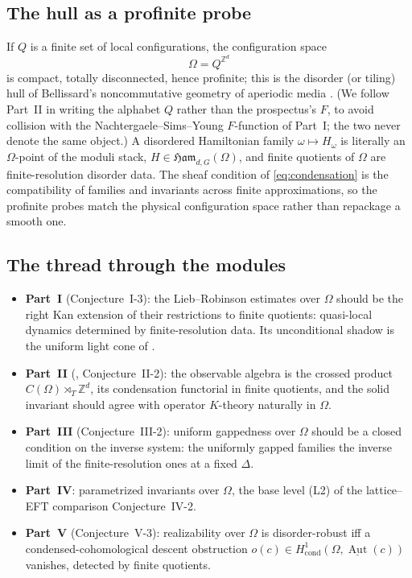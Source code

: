 \documentclass[12pt]{article}
\newcommand{\cg}[1]{\underline{#1}}            %
\newcommand{\Ffun}{F}                          %
\newcommand{\Ham}{\mathfrak{Ham}}              %
\newcommand{\gapbound}{\Delta}                  %
\newcommand{\dis}{\Omega}                       %
\newcommand{\ZZ}{\mathbb{Z}}
\newcommand{\Aut}{\operatorname{Aut}}
\theoremstyle{plain}
\theoremstyle{definition}
\theoremstyle{remark}
\begin{document}
\subsection{The hull as a profinite probe}

If $Q$ is a finite set of local configurations, the configuration space
\begin{equation}
\label{eq:hull}
\dis=Q^{\ZZ^d}
\end{equation}
is compact, totally disconnected, hence profinite; this is the disorder (or tiling) hull of
Bellissard's noncommutative geometry of aperiodic media \cite{bellissard-ncg-qhe,kellendonk-tilings}.
(We follow Part~II in writing the
alphabet $Q$ rather than the prospectus's $\Ffun$, to avoid collision with the
Nachtergaele--Sims--Young $\Ffun$-function of Part~I; the two never denote the same
object.) A disordered Hamiltonian family $\omega\mapsto H_\omega$ is literally an
$\dis$-point of the moduli stack, $H\in\Ham_{d,G}(\dis)$, and finite quotients of $\dis$
are finite-resolution disorder data. The sheaf condition of \eqref{eq:condensation} is
the compatibility of families and invariants across finite approximations, so the
profinite probes match the physical configuration space rather than repackage a smooth
one.

\subsection{The thread through the modules}

\begin{itemize}
\item \textbf{Part~I} (Conjecture~I-3): the Lieb--Robinson estimates over $\dis$ should be
  the right Kan extension of their restrictions to finite quotients: quasi-local dynamics
  determined by finite-resolution data. Its unconditional shadow is the uniform light cone
  of .
\item \textbf{Part~II} (, Conjecture~II-2): the observable algebra is the
  crossed product $C(\dis)\rtimes_T\ZZ^d$, its condensation functorial in finite quotients,
  and the solid invariant should agree with operator $K$-theory naturally in $\dis$.
\item \textbf{Part~III} (Conjecture~III-2): uniform gappedness over $\dis$ should be a
  closed condition on the inverse system: the uniformly gapped families the inverse limit
  of the finite-resolution ones at a fixed $\gapbound$.
\item \textbf{Part~IV}: parametrized invariants over $\dis$, the base level (L2) of the
  lattice--EFT comparison Conjecture~IV-2.
\item \textbf{Part~V} (Conjecture~V-3): realizability over $\dis$ is disorder-robust iff a
  condensed-cohomological descent obstruction $o(c)\in H^1_{\mathrm{cond}}(\dis,\cg{\Aut}(c))$
  vanishes, detected by finite quotients.
\end{itemize}
\end{document}
